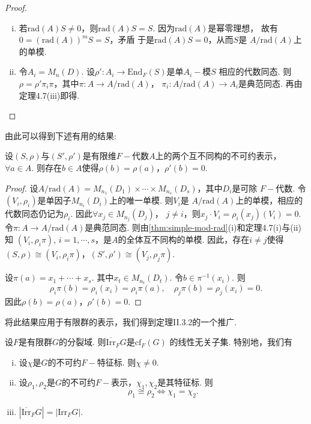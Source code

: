 \begin{proof}
    \begin{enumerate}[(i)]
        \item 若$\mathrm{rad}(A)S \neq 0$，则$\mathrm{rad}(A)S = S$. 因为$\mathrm{rad}(A)$是幂零理想，
        故有$0 = (\mathrm{rad}(A))^m S = S$，矛盾\! 于是$\mathrm{rad}(A)S = 0$，从而$S$是
        $A/\mathrm{rad}(A)$上的单模.
        \item 令$A_i = M_n(D)$. 设$\rho': A_i \longrightarrow \mathrm{End}_F(S)$是单$A_i-\!\!$模$S$
        相应的代数同态. 则$\rho = \rho' \pi_i \pi$，其中$\pi: A \longrightarrow A/\mathrm{rad}(A)$，
        $\pi_i: A/\mathrm{rad}(A) \longrightarrow A_i$是典范同态. 再由定理4.7(iii)即得. \qedhere
    \end{enumerate}
\end{proof}

由此可以得到下述有用的结果:

\begin{theorem}
    设$(S, \rho)$与$(S', \rho')$是有限维$F-\!\!$代数$A$上的两个互不同构的不可约表示，$\forall a
    \in A$. 则存在$b \in A$使得$\rho(b) = \rho(a)$，$\rho'(b) = 0$.
\end{theorem}

\begin{proof}
    设$A/\mathrm{rad}(A) = M_{n_1}(D_1) \times \cdots \times M_{n_s}(D_s)$，其中$D_i$是可除
    $F-\!\!$代数. 令$(V_i, \rho_i)$是单因子$M_{n_i}(D_i)$上的唯一单模. 则$V_i$是
    $A/\mathrm{rad}(A)$上的单模，相应的代数同态仍记为$\rho_i$. 因此$\forall x_j \in M_{n_j}(D_j)$，
    $j \neq i$，则$x_j \cdot V_i = \rho_i(x_j)(V_i) = 0$. 令$\pi: A \longrightarrow
    A/\mathrm{rad}(A)$是典范同态. 则由\cref{thm:simple-mod-rad}(i)和定理4.7(i)与(ii)知
    $(V_i, \rho_i \pi)$, $i = 1, \cdots, s$，是$A$的全体互不同构的单模. 因此，存在$i \neq j$使得
    $(S, \rho) \cong (V_i, \rho_i \pi)$，$(S', \rho') \cong (V_j, \rho_j \pi)$.\par
    设$\pi(a) = x_1 + \cdots + x_s$. 其中$x_t \in M_{n_t}(D_t)$. 令$b \in \pi^{-1}(x_i)$. 则
    \[ \rho_i \pi(b) = \rho_i(x_i) = \rho_i \pi(a), \quad \rho_j \pi(b) = \rho_j(x_i) = 0. \]
    因此$\rho(b) = \rho(a)$，$\rho'(b) = 0$.
\end{proof}

将此结果应用于有限群的表示，我们得到定理II.3.2的一个推广.

\begin{theorem}
    设$F$是有限群$G$的分裂域. 则$\overline{\mathrm{Irr}}_F G$是$\mathrm{cf}_F(G)$
    的线性无关子集. 特别地，我们有
    \begin{enumerate}[(i)]
        \item 设$\chi$是$G$的不可约$F-\!\!$特征标. 则$\chi \neq 0$.
        \item 设$\rho_1, \rho_2$是$G$的不可约$F-\!\!$表示，$\chi_1, \chi_2$是其特征标. 则
        \[ \rho_1 \cong \rho_2 \iff \chi_1 = \chi_2. \]
        \item $|\overline{\mathrm{Irr}}_F G| = |\mathrm{Irr}_F G|$.
    \end{enumerate}
\end{theorem}

